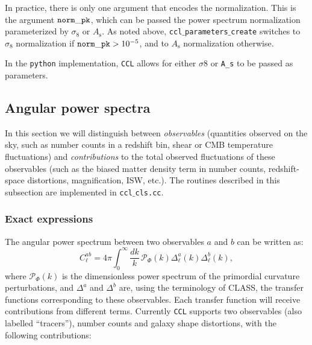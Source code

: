 \documentclass[\docopts]{\docclass}
\newcommand{\ccl}{{\tt CCL}\xspace}
\begin{document}
In practice, there is only one argument that encodes the normalization. This is the argument ${\tt norm\_pk}$, which can be passed the power spectrum normalization parameterized by $\sigma_8$ or $A_\mathrm{s}$. As noted above, {\tt ccl$\_$parameters$\_$create} switches to $\sigma_8$ normalization if ${\tt norm\_pk} > 10^{-5}$, and to $A_{\mathrm s}$ normalization otherwise.

In the {\tt python} implementation, {\tt CCL} allows for either $\sigma 8$ or {\tt A\_s} to be passed as parameters.

\subsection{Angular power spectra}
\label{sec:cl}

In this section we will distinguish between {\sl observables} (quantities observed on the sky, such as number counts in a redshift bin, shear or CMB temperature fluctuations) and {\sl contributions} to the total observed fluctuations of these observables (such as the biased matter density term in number counts, redshift-space distortions, magnification, ISW, etc.).
The routines described in this subsection are implemented in {\tt ccl$\_$cls.cc}.

\subsubsection{Exact expressions}
The angular power spectrum between two observables $a$ and $b$ can be written as:
\begin{equation}
 C^{ab}_\ell=4\pi\int_0^\infty \frac{dk}{k}\,\mathcal{P}_\Phi(k)\Delta^a_\ell(k)\Delta^b_\ell(k),
\end{equation}
where $\mathcal{P}_\Phi(k)$ is the dimensionless power spectrum of the primordial curvature perturbations, and $\Delta^a$ and $\Delta^b$ are, using the terminology of CLASS, the transfer functions corresponding to these observables. Each transfer function will receive contributions from different terms. Currently \ccl supports two observables (also labelled ``tracers''), number counts and galaxy shape distortions, with the following contributions:
\end{document}
